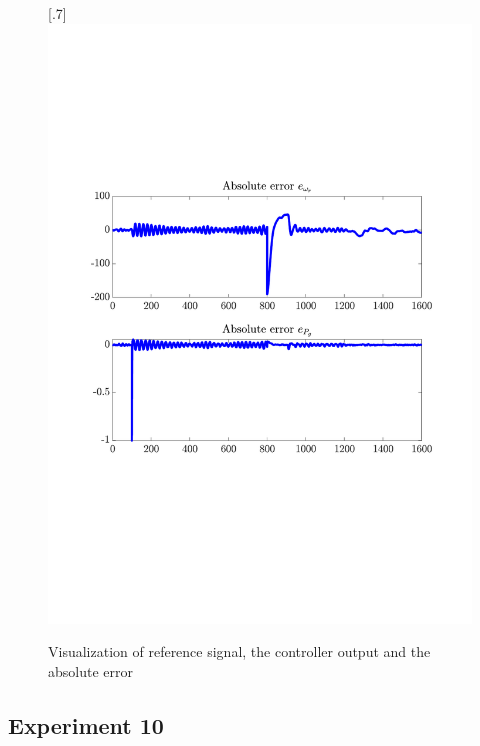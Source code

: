 \begin{figure}[H]
[.7\textwidth]{\includegraphics[width=1\linewidth, scale=1, trim=55 230 55 120,clip]{fig/Open_loop/exp_9_error.pdf}}
    \caption{Visualization of reference signal, the controller output and the absolute error}
    \label{fig:app:cl_results:exp9}
\end{figure}


\subsection{Experiment 10}

